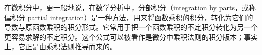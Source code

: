 


在微积分中，更一般地说，在数学分析中，分部积分（integration by parts，或称偏积分 partial integration）是一种方法，用来将函数乘积的积分，转化为它们的导数与原函数乘积的积分形式。它常用于把一个函数乘积的不定积分转化为另一个更容易求解的不定积分。这个公式可以被看作是微分中乘积法则的积分版本；事实上，它正是由乘积法则推导而来的。

